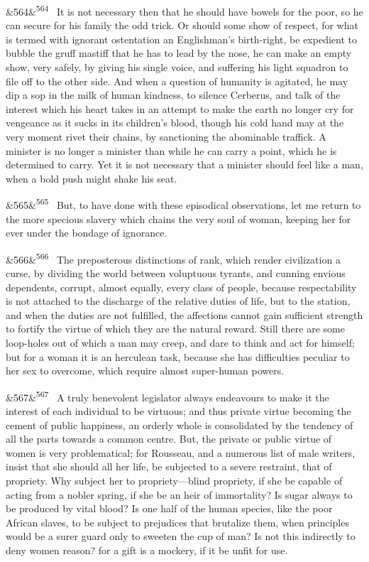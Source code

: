 \documentclass[12pt]{article}
\newcommand{\para}[1][]{\par\noindent\ifx&#1&\else\textsuperscript{\footnotesize #1}~\fi}
\begin{document}
\para[564] It is not necessary then that he should have bowels for the poor, so he can secure for his family the odd trick. Or should some show of respect, for what is termed with ignorant ostentation an Englishman's birth-right, be expedient to bubble the gruff mastiff that he has to lead by the nose, he can make an empty show, very safely, by giving his single voice, and suffering his light squadron to file off to the other side. And when a question of humanity is agitated, he may dip a sop in the milk of human kindness, to silence Cerberus, and talk of the interest which his heart takes in an attempt to make the earth no longer cry for vengeance as it sucks in its children's blood, though his cold hand may at the very moment rivet their chains, by sanctioning the abominable traffick. A minister is no longer a minister than while he can carry a point, which he is determined to carry. Yet it is not necessary that a minister should feel like a man, when a bold push might shake his seat.

\para[565] But, to have done with these episodical observations, let me return to the more specious slavery which chains the very soul of woman, keeping her for ever under the bondage of ignorance.

\para[566] The preposterous distinctions of rank, which render civilization a curse, by dividing the world between voluptuous tyrants, and cunning envious dependents, corrupt, almost equally, every class of people, because respectability is not attached to the discharge of the relative duties of life, but to the station, and when the duties are not fulfilled, the affections cannot gain sufficient strength to fortify the virtue of which they are the natural reward. Still there are some loop-holes out of which a man may creep, and dare to think and act for himself; but for a woman it is an herculean task, because she has difficulties peculiar to her sex to overcome, which require almost super-human powers.

\para[567] A truly benevolent legislator always endeavours to make it the interest of each individual to be virtuous; and thus private virtue becoming the cement of public happiness, an orderly whole is consolidated by the tendency of all the parts towards a common centre. But, the private or public virtue of women is very problematical; for Rousseau, and a numerous list of male writers, insist that she should all her life, be subjected to a severe restraint, that of propriety. Why subject her to propriety---blind propriety, if she be capable of acting from a nobler spring, if she be an heir of immortality? Is sugar always to be produced by vital blood? Is one half of the human species, like the poor African slaves, to be subject to prejudices that brutalize them, when principles would be a surer guard only to sweeten the cup of man? Is not this indirectly to deny women reason? for a gift is a mockery, if it be unfit for use.
\end{document}
